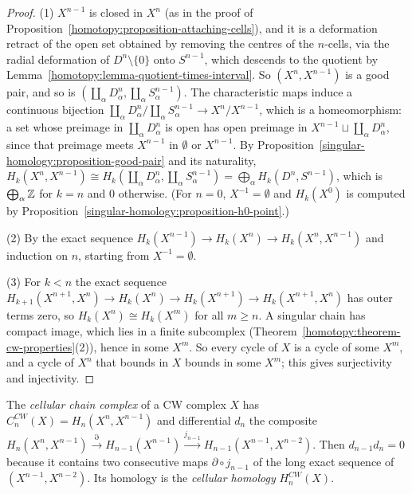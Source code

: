\begin{proof}
(1) $X^{n-1}$ is closed in $X^n$ (as in the proof of Proposition~\ref{homotopy:proposition-attaching-cells}), and it is a deformation retract of the open set obtained by
removing the centres of the $n$-cells, via the radial deformation of $D^n \setminus \{0\}$ onto $S^{n-1}$, which descends to the quotient by
Lemma~\ref{homotopy:lemma-quotient-times-interval}. So $(X^n, X^{n-1})$ is a good pair, and so is $(\coprod_\alpha D^n_\alpha, \coprod_\alpha S^{n-1}_\alpha)$. The
characteristic maps induce a continuous bijection $\coprod_\alpha D^n_\alpha/\coprod_\alpha S^{n-1}_\alpha \to X^n/X^{n-1}$, which is a homeomorphism: a set whose
preimage in $\coprod_\alpha D^n_\alpha$ is open has open preimage in $X^{n-1} \sqcup \coprod_\alpha D^n_\alpha$, since that preimage meets $X^{n-1}$ in $\emptyset$ or
$X^{n-1}$. By Proposition~\ref{singular-homology:proposition-good-pair} and its naturality,
$H_k(X^n, X^{n-1}) \cong H_k(\coprod_\alpha D^n_\alpha, \coprod_\alpha S^{n-1}_\alpha) = \bigoplus_\alpha H_k(D^n, S^{n-1})$, which is $\bigoplus_\alpha \mathbb{Z}$ for $k = n$ and $0$
otherwise. (For $n = 0$, $X^{-1} = \emptyset$ and $H_k(X^0)$ is computed by Proposition~\ref{singular-homology:proposition-h0-point}.)

(2) By the exact sequence $H_k(X^{n-1}) \to H_k(X^n) \to H_k(X^n, X^{n-1})$ and induction on $n$, starting from $X^{-1} = \emptyset$.

(3) For $k < n$ the exact sequence $H_{k+1}(X^{n+1}, X^n) \to H_k(X^n) \to H_k(X^{n+1}) \to H_k(X^{n+1}, X^n)$ has outer terms zero, so $H_k(X^n) \cong H_k(X^m)$ for all
$m \geq n$. A singular chain has compact image, which lies in a finite subcomplex (Theorem~\ref{homotopy:theorem-cw-properties}(2)), hence in some $X^m$. So
every cycle of $X$ is a cycle of some $X^m$, and a cycle of $X^n$ that bounds in $X$ bounds in some $X^m$; this gives surjectivity and injectivity.
\end{proof}

\begin{definition}\label{singular-homology:definition-cellular}
The \emph{cellular chain complex} of a CW complex $X$ has $C^{CW}_n(X) = H_n(X^n, X^{n-1})$ and differential $d_n$ the composite
$H_n(X^n, X^{n-1}) \xrightarrow{\partial} H_{n-1}(X^{n-1}) \xrightarrow{j_{n-1}} H_{n-1}(X^{n-1}, X^{n-2})$. Then $d_{n-1}d_n = 0$ because it contains two consecutive maps
$\partial \circ j_{n-1}$ of the long exact sequence of $(X^{n-1}, X^{n-2})$. Its homology is the \emph{cellular homology} $H^{CW}_n(X)$.
\end{definition}

